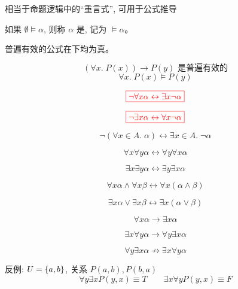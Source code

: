 \begin{frame}{}
  \begin{center}
    相当于命题逻辑中的``重言式'', 可用于公式推导
  \end{center}

  \begin{definition}
    如果 $\emptyset \models \alpha$, 则称 $\alpha$ 是,
    记为 $\models \alpha$。
  \end{definition}

  \pause
  \vspace{0.60cm}
  \begin{center}
    普遍有效的公式在下均为真。

    \[
      (\forall x.\; P(x)) \to P(y) \text{ 是普遍有效的}
    \]
    \[
      \forall x.\; P(x) \models P(y)
    \]
  \end{center}
\end{frame}

\begin{frame}{}
  \[
    \textcolor{red}{\boxed{\lnot \forall x \alpha \leftrightarrow \exists x \lnot \alpha}}
  \]

  \[
    \textcolor{red}{\boxed{\lnot \exists x \alpha \leftrightarrow \forall x \lnot \alpha}}
  \]

  \[
    \lnot (\forall x \in A.\; \alpha) \leftrightarrow \exists x \in A.\; \lnot \alpha
  \]
\end{frame}

\begin{frame}{}
  \[
    \forall x \forall y \alpha \leftrightarrow \forall y \forall x \alpha
  \]

  \[
    \exists x \exists y \alpha \leftrightarrow \exists y \exists x \alpha
  \]
\end{frame}

\begin{frame}{}
  \[
    \forall x \alpha \land \forall x \beta
      \leftrightarrow \forall x (\alpha \land \beta)
  \]

  \[
    \exists x \alpha \lor \exists x \beta
      \leftrightarrow \exists x (\alpha \lor \beta)
  \]
\end{frame}

\begin{frame}{}
  \[
    \forall x \alpha \to \exists x \alpha
  \]

  \[
    \exists x \forall y \alpha \to \forall y \exists x \alpha
  \]

  \[
    \forall y \exists x \alpha \not\to \exists x \forall y \alpha
  \]

  \pause
  \vspace{0.30cm}
  \begin{center}
    反例: $U = \{a, b\}$, \qquad 关系 $P(a, b), P(b, a)$
    \[
      \forall y \exists x P(y, x) \equiv T \qquad \exists x \forall y P(y, x) \equiv F
    \]
  \end{center}
\end{frame}

